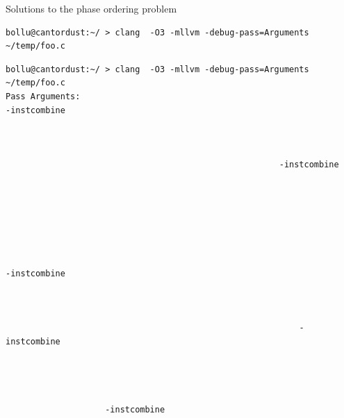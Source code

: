 \documentclass[8pt]{beamer}
\begin{document}
\begin{frame}[fragile]{Solutions to the phase ordering problem}
\begin{verbatim}
bollu@cantordust:~/ > clang  -O3 -mllvm -debug-pass=Arguments ~/temp/foo.c
\end{verbatim}
\begin{verbatim}
bollu@cantordust:~/ > clang  -O3 -mllvm -debug-pass=Arguments ~/temp/foo.c
Pass Arguments:                                               
-instcombine                                                                
                                                                     
                                                                              
                                                                  
                                                       -instcombine
                                                                 
                                                                               
                                                                               
                                                                            
                                                              
                                                                             
                                                                           
-instcombine                                                             
                                                                        
                                                                              
                                                                            
                                                           -instcombine
                                                                           
                                                                              
                                                                           
                                                                
                    -instcombine                                      
                                                                       

\end{verbatim}
\end{frame}
\end{document}
